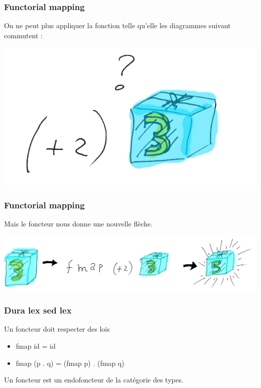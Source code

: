 \documentclass{beamer}
\begin{document}
\begin{frame}
\frametitle{Functorial mapping}
On ne peut plus appliquer la fonction telle qu'elle les diagrammes suivant commutent :

\begin{center}
\includegraphics[scale=0.3]{wrong_type.png}
\end{center}
\end{frame}

\begin{frame}
\frametitle{Functorial mapping}
Mais le foncteur nous donne une nouvelle flèche.
\begin{center}
\includegraphics[scale=0.19]{f_fct.png}
\end{center}
\end{frame}



\begin{frame}
\frametitle{Dura lex sed lex}
\begin{alertblock}{Un foncteur doit respecter des lois}
\begin{itemize}
\item fmap id = id
\item fmap (p . q) = (fmap p) . (fmap q)

\end{itemize}
\end{alertblock}

\pause
Un foncteur est un endofoncteur de la catégorie des types.
\end{frame}
\end{document}
